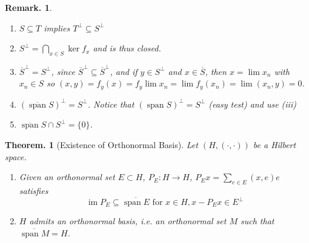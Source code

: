 \documentclass[11pt, a4paper]{memoir}
\theoremstyle{change}
\newtheorem{theorem}{Theorem.}[section]
\theoremstyle{plain}
\theoremstyle{nonumberplain}
\newtheorem{remark}{Remark.}
\DeclareMathOperator{\im}{im}
\DeclareMathOperator{\spn}{span}
\newcommand{\inr}[1]{\ensuremath{\left(#1\right)}}
\numberwithin{equation}{section}
\begin{document}
\begin{remark}
    \begin{enumerate}[nl,r]
        \item $S\subseteq T$ implies $T^\perp\subseteq S^\perp$
        \item $S^\perp=\bigcap_{x\in S}\ker f_x$ and is thus closed.
        \item $\overline{S}^\perp=S^\perp$, since $\overline{S}^\perp\subseteq\overline{S}^\perp$, and if $y\in S^\perp$ and $x\in\overline{S}$, then $x=\lim x_n$ with $x_n\in S$ so $\inr{x,y}=f_y(x)=f_y\lim x_n=\lim f_y(x_n)=\lim\inr{x_n,y}=0$.
        \item $(\overline{\spn}S)^\perp=S^\perp$.
            Notice that $(\spn S)^\perp=S^\perp$ (easy test) and use (iii)
        \item $\overline{\spn}S\cap S^\perp=\{0\}$.
    \end{enumerate}
\end{remark}
\begin{theorem}[Existence of Orthonormal Basis]
    Let $(H,\inr{\cdot,\cdot})$ be a Hilbert space.
    \begin{enumerate}[nl,r]
        \item Given an orthonormal set $E\subset H$, $P_E:H\to H$, $P_Ex=\sum_{e\in E}\inr{x,e}e$ satisfies
            \begin{equation*}
                \im P_E\subseteq\overline{\spn E}\text{ for }x\in H, x-P_Ex\in E^\perp
            \end{equation*}
        \item $H$ admits an orthonormal basis, i.e. an orthonormal set $M$ such that $\overline{\spn M}=H$.
    \end{enumerate}
\end{theorem}
\end{document}
